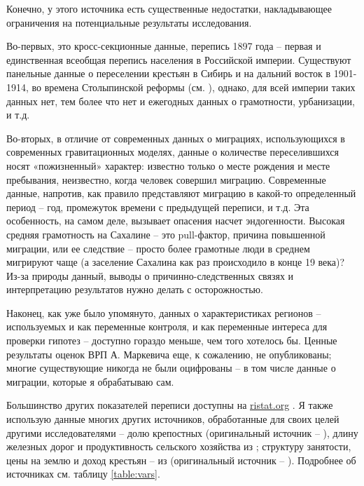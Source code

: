 \documentclass[a4paper,12pt]{article}
\begin{document}
Конечно, у этого источника есть существенные недостатки, накладывающее ограничения на потенциальные результаты исследования.

Во-первых, это кросс-секционные данные, перепись 1897 года – первая и единственная всеобщая перепись населения в Российской империи. Существуют панельные данные о переселении крестьян в Сибирь и на дальний восток в 1901-1914, во времена Столыпинской реформы (см. \cite{chernina_property_2014}), однако, для всей империи таких данных нет, тем более что нет и ежегодных данных о грамотности, урбанизации, и т.д. 

Во-вторых, в отличие от современных данных о миграциях, использующихся в современных гравитационных моделях, данные о количестве переселившихся носят «пожизненный» характер: известно только о месте рождения и месте пребывания, неизвестно, когда человек совершил миграцию. Современные данные, напротив, как правило представляют миграцию в какой-то определенный период – год, промежуток времени с предыдущей переписи, и т.д. 
Эта особенность, на самом деле, вызывает опасения насчет эндогенности. 
Высокая средняя грамотность на Сахалине – это pull-фактор, причина повышенной миграции, или ее следствие – просто более грамотные люди в среднем мигрируют чаще (а заселение Сахалина как раз происходило в конце 19 века)? 
Из-за природы данный, выводы о причинно-следственных связях и интерпретацию результатов нужно делать с осторожностью.


Наконец, как уже было упомянуто, данных о характеристиках регионов – используемых и как переменные контроля, и как переменные интереса для проверки гипотез – доступно гораздо меньше, чем того хотелось бы. Ценные результаты оценок ВРП А. Маркевича еще, к сожалению, не опубликованы; многие существующие никогда не были оцифрованы -- в том числе данные о миграции, которые я обрабатываю сам.

Большинство других показателей переписи доступны на \href{http://ristat.org}{ristat.org} \citep{ristat_2020}. Я также использую данные многих других источников, обработанные для своих целей другими исследователями -- долю крепостных (оригинальный источник -- \cite{vremennik_1866}), длину железных дорог и продуктивность сельского хозяйства из \cite{markevich_abolition_2018}; структуру занятости, цены на землю и доход крестьян -- из \cite{lindert_inequality_2014} (оригинальный источник -- \cite{opyt_1906}). Подробнее об источниках см. таблицу \ref{table:vars}.
\end{document}
